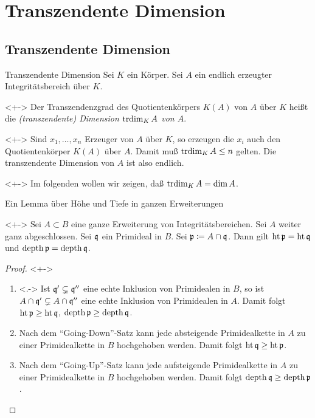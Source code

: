 \section{Transzendente Dimension}

\subsection{Transzendente Dimension}

\begin{frame}{Transzendente Dimension}
	Sei \(K\) ein Körper. Sei \(A\) ein endlich erzeugter Integritätsbereich über \(K\).
	\begin{definition}<+->
		Der Transzendenzgrad des Quotientenkörpers \(K(A)\) von \(A\) über \(K\) heißt die \emph{(transzendente)
		Dimension \(\operatorname{trdim}_K A\) von \(A\)}.
	\end{definition}
	\begin{remark}<+->
		Sind \(x_1, \dotsc, x_n\) Erzeuger von \(A\) über \(K\), so erzeugen die
		\(x_i\) auch den Quotientenkörper \(K(A)\) über \(A\). Damit muß
		\(\operatorname{trdim}_K A \leq n\) gelten. Die transzendente Dimension von \(A\) ist
		also endlich.
	\end{remark}
	\begin{visibleenv}<+->
		Im folgenden wollen wir zeigen, daß \(\operatorname{trdim}_K A = \dim A\).
	\end{visibleenv}
\end{frame}

\begin{frame}{Ein Lemma über Höhe und Tiefe in ganzen Erweiterungen}
	\begin{lemma}<+->
		Sei \(A \subset B\) eine ganze Erweiterung von
		Integritätsbereichen. Sei \(A\) weiter ganz abgeschlossen.
		Sei \(\mathfrak{q}\) ein Primideal in \(B\). Sei \(\mathfrak{p} \coloneqq A \cap \mathfrak{q}\).
		Dann gilt \(\operatorname{ht} \mathfrak{p} = \operatorname{ht} \mathfrak{q}\) und \(\operatorname{depth} \mathfrak{p} = \operatorname{depth} \mathfrak{q}\).
	\end{lemma}
	\begin{proof}<+->
		\begin{enumerate}[<+->]
		\item<.->
			Ist \(\mathfrak{q}' \subsetneq \mathfrak{q}''\) eine echte Inklusion von
			Primidealen in \(B\), so ist \(A \cap \mathfrak{q}' \subsetneq A
			\cap \mathfrak{q}''\) eine echte Inklusion von Primidealen in
			\(A\). Damit folgt
			\(\operatorname{ht} \mathfrak{p} \ge \operatorname{ht} \mathfrak{q}\), \(\operatorname{depth} \mathfrak{p} \ge \operatorname{depth} \mathfrak{q}\).
		\item
			Nach dem "`Going-Down"'-Satz kann jede absteigende Primidealkette in \(A\)
			zu einer Primidealkette in \(B\) hochgehoben werden. Damit folgt
			\(\operatorname{ht} \mathfrak{q} \ge \operatorname{ht} \mathfrak{p}\).
		\item
			Nach dem "`Going-Up"'-Satz kann jede aufsteigende Primidealkette in
			\(A\) zu einer Primidealkette in \(B\) hochgehoben werden. Damit
			folgt \(\operatorname{depth} \mathfrak{q} \ge \operatorname{depth} \mathfrak{p}\).
			\qedhere
		\end{enumerate}
	\end{proof}
\end{frame}

